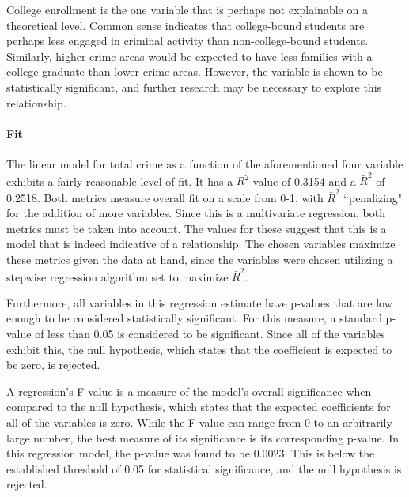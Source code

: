 \documentclass[12pt]{article}
\begin{document}
	\par
	
	College enrollment is the one variable that is perhaps not explainable on a theoretical level.  Common sense indicates that college-bound students are perhaps less engaged in criminal activity than non-college-bound students.  Similarly, higher-crime areas would be expected to have less families with a college graduate than lower-crime areas.  However, the variable is shown to be statistically significant, and further research may be necessary to explore this relationship.
	
	\paragraph{Fit}

	The linear model for total crime as a function of the aforementioned four variable exhibits a fairly reasonable level of fit.  It has a $ R^{2} $ value of 0.3154 and a $ \bar{R}^{2} $ of 0.2518.  Both metrics measure overall fit on a scale from 0-1, with $ \bar{R}^{2} $ ``penalizing" for the addition of more variables.  Since this is a multivariate regression, both metrics must be taken into account.  The values for these suggest that this is a model that is indeed indicative of a relationship.  The chosen variables maximize these metrics given the data at hand, since the variables were chosen utilizing a stepwise regression algorithm set to maximize $ \bar{R}^{2} $.
	
	\par
	
	Furthermore, all variables in this regression estimate have p-values that are low enough to be considered statistically significant.  For this measure, a standard p-value of less than 0.05 is considered to be significant.  Since all of the variables exhibit this, the null hypothesis, which states that the coefficient is expected to be zero, is rejected.
	
	\par
	
	A regression's F-value is a measure of the model's overall significance when compared to the null hypothesis, which states that the expected coefficients for all of the variables is zero.  While the F-value can range from 0 to an arbitrarily large number, the best measure of its significance is its corresponding p-value.  In this regression model, the p-value was found to be 0.0023.  This is below the established threshold of 0.05 for statistical significance, and the null hypothesis is rejected.
\end{document}
